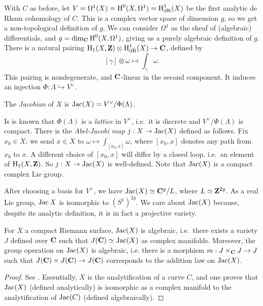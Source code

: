 With $C$ as before, let $V=\Omega^1(X)=\operatorname{H}^0(X,\Omega^1)=\operatorname{H}^1_\text{dR}(X)$ be 
the first analytic de Rham cohomology of $C$. 
This is a complex vector space of dimension $g$, so we get a non-topological 
definition of $g$. We can consider $\Omega^1$ as the sheaf of (algebraic) 
differentials, and $g=\dim_{\mathbf{C}}\operatorname{H}^0(X,\Omega^1)$, giving us a purely algebraic 
definition of $g$. There is a natural pairing 
$\operatorname{H}_1(X,\mathbf{Z})\otimes\operatorname{H}_\text{dR}^1(X)\to\mathbf{C}$, defined by 
\[
  [\gamma]\otimes \omega \mapsto \int_\gamma \omega .
\]
This pairing is nondegenerate, and $\mathbf{C}$-linear in the second component. 
It induces an injection $\Phi:\Lambda\hookrightarrow V^\vee$. 

\begin{definition}[analytic]
The \emph{Jacobian} of $X$ is $\operatorname{Jac}(X)=V^\vee/\Phi(\Lambda)$. 
\end{definition}

Is is known that $\Phi(\Lambda)$ is a \emph{lattice} in $V^\vee$, i.e.~it is discrete 
and $V^\vee/\Phi(\Lambda)$ is compact. There is the \emph{Abel-Jacobi map} 
$j:X\to \operatorname{Jac}(X)$ defined as follows. Fix $x_0\in X$; we send $x\in X$ to 
$\omega\mapsto \int_{[x_0,x]} \omega$, where $[x_0,x]$ denotes any path from 
$x_0$ to $x$. A different choice of $[x_0,x]$ will differ by a closed loop, 
i.e.~an element of $\operatorname{H}_1(X,\mathbf{Z})$. So $j:X\to\operatorname{Jac}(X)$ is well-defined. Note 
that $\operatorname{Jac}(X)$ is a compact complex Lie group. 

After choosing a basis for $V^\vee$, we have $\operatorname{Jac}(X)\simeq \mathbf{C}^g/L$, where 
$L\simeq \mathbf{Z}^{2 g}$. As a real Lie group, $\operatorname{Jac} X$ is isomorphic to 
$(S^1)^{2 g}$. 
We care about $\operatorname{Jac}(X)$ because, despite its analytic definition, it is in fact 
a projective variety.

\begin{theorem}
For $X$ a compact Riemann surface, $\operatorname{Jac}(X)$ is algebraic, i.e.~there exists a 
variety $J$ defined over $\mathbf{C}$ such that $J(\mathbf{C})\simeq\operatorname{Jac}(X)$ as 
complex manifolds. Moreover, the group operation on $\operatorname{Jac}(X)$ is algebraic, 
i.e. there is a morphism $m:J\times_{\mathbf{C}} J\to J$ such that 
$J(\mathbf{C})\times J(\mathbf{C})\to J(\mathbf{C})$ corresponds to the 
addition law on $\operatorname{Jac}(X)$. 
\end{theorem}
\begin{proof}
See \cite[I.18]{mi-av}. Essentially, $X$ is the analytification of a curve $C$, 
and one proves that $\operatorname{Jac}(X)$ (defined analytically) is isomorphic as a complex 
manifold to the analytification of $\operatorname{Jac}(C)$ (defined algebraically). 
\end{proof}

